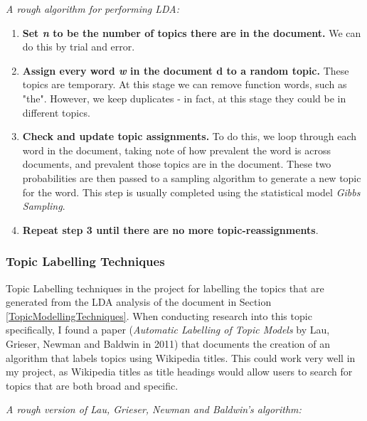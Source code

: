 \documentclass[12pt]{article}
\begin{document}
\emph{A rough algorithm for performing LDA\cite{ldaExplanation}:}

\begin{enumerate}
	\item \textbf{Set \emph{n} to be the number of topics there are in the document.} We can do this by trial and error. \\
	\item \textbf{Assign every word \emph{w} in the document {d} to a random topic.} These topics are temporary. At this stage we can remove function words, such as "the". However, we keep duplicates - in fact, at this stage they could be in different topics. \\
	\item \textbf{Check and update topic assignments.} To do this, we loop through each word in the document, taking note of how prevalent the word is across documents, and prevalent those topics are in the document. These two probabilities are then passed to a sampling algorithm to generate a new topic for the word. This step is usually completed using the statistical model \emph{Gibbs Sampling}.
	\item \textbf{Repeat step 3 until there are no more topic-reassignments}. 
\end{enumerate}

\subsubsection{Topic Labelling Techniques}

Topic Labelling techniques in the project for labelling the topics that are generated from the LDA analysis of the document in Section \ref{TopicModellingTechniques}. When conducting research into this topic specifically, I found a paper (\emph{Automatic Labelling of Topic Models} by Lau, Grieser, Newman and Baldwin in 2011\cite{topicLabelling}) that documents the creation of an algorithm that labels topics using Wikipedia\cite{wikipedia} titles. This could work very well in my project, as Wikipedia titles as title headings would allow users to search for topics that are both broad and specific. 

\emph{A rough version of Lau, Grieser, Newman and Baldwin's algorithm:}
\end{document}
